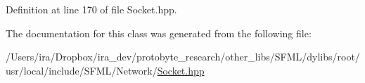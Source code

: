 Definition at line 170 of file Socket.\-hpp.



The documentation for this class was generated from the following file\-:\begin{DoxyCompactItemize}
\item 
/\-Users/ira/\-Dropbox/ira\-\_\-dev/protobyte\-\_\-research/other\-\_\-libs/\-S\-F\-M\-L/dylibs/root/usr/local/include/\-S\-F\-M\-L/\-Network/\hyperlink{_socket_8hpp}{Socket.\-hpp}\end{DoxyCompactItemize}

